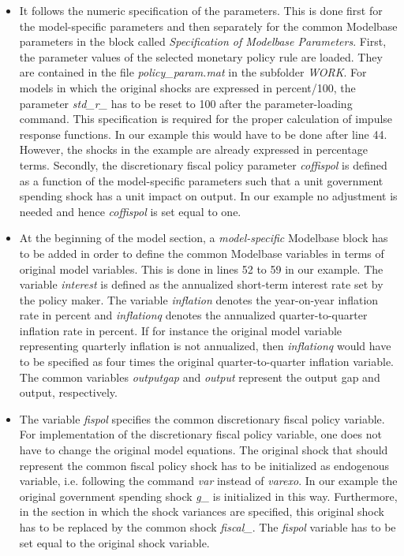 \begin{itemize}
\item It follows the numeric specification of the parameters. This is done first for the model-specific parameters and then separately for the common Modelbase parameters in the block called \textit{Specification of Modelbase Parameters}. First, the parameter values of the selected monetary policy rule are loaded. They are contained in the file \textit{policy\_param.mat} in the subfolder \textit{WORK}. For models in which the original shocks are expressed in percent/100, the parameter \textit{std\_r\_} has to be reset to 100 after the parameter-loading command. This specification is required for the proper calculation of impulse response functions. In our example this would have to be done after line 44. However, the shocks in the example are already expressed in percentage terms. Secondly, the discretionary fiscal policy parameter \textit{coffispol} is defined as a function of the model-specific parameters such that a unit government spending shock has a unit impact on output. In our example no adjustment is needed and hence \textit{coffispol} is set equal to one. %
\item At the beginning of the model section, a \textit{model-specific} Modelbase block has to be added in order to define the common Modelbase variables in terms of original model variables. This is done in lines 52 to 59 in our example. The variable \textit{interest} is defined as the annualized short-term interest rate set by the policy maker. The variable \textit{inflation} denotes the year-on-year inflation rate in percent and \textit{inflationq} denotes the annualized quarter-to-quarter inflation rate in percent. If for instance the original model variable representing quarterly inflation is not annualized, then \textit{inflationq} would have to be specified as four times the original quarter-to-quarter inflation variable. The common variables \textit{outputgap} and \textit{output} represent the output gap and output, respectively.
\item The variable \textit{fispol} specifies the common discretionary fiscal policy variable. For implementation of the discretionary fiscal policy variable, one does not have to change the original model equations. The original shock that should represent the common fiscal policy shock has to be initialized as endogenous variable, i.e. following the command \textit{var} instead of \textit{varexo}. In our example the original government spending shock \textit{g\_} is initialized in this way. Furthermore, in the section in which the shock variances are specified, this original shock has to be replaced by the common shock \textit{fiscal\_}. The \textit{fispol} variable has to be set equal to the original shock variable.

\end{itemize}
